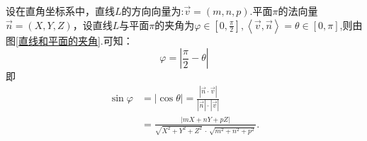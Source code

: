 \theorem[直线与平面的夹角]
\quad 设在{\color{dy}直角坐标系}中，直线$L$的方向向量为:$\overrightarrow{v}=(m,n,p).$平面$\pi $的法向量$\overrightarrow{n}=(X,Y,Z)$，设直线$L$与平面$\pi $的夹角为$\varphi \in \displaystyle \left[ 0,\frac{\pi }{2} \right],\left\langle \overrightarrow{v},\overrightarrow{n}\right\rangle =\theta \in \displaystyle \left[ 0,\pi  \right]$,则由图\ref{直线和平面的夹角}.可知：
$$\varphi =\left| \frac{\pi }{2}-\theta \right| $$
即
\begin{equation}
\begin{split}
\sin \varphi &=|\cos \theta |=\frac{|\overrightarrow{n} \cdot \overrightarrow{v} |}{|\overrightarrow{n}| \cdot |\overrightarrow{v}|}\\
&=\frac{\left| mX+nY+pZ\right| }{\sqrt{X^2+Y^2+Z^2}\,\cdot \,\sqrt{m^2+n^2+p^2}}.
\end{split}
\end{equation} 
